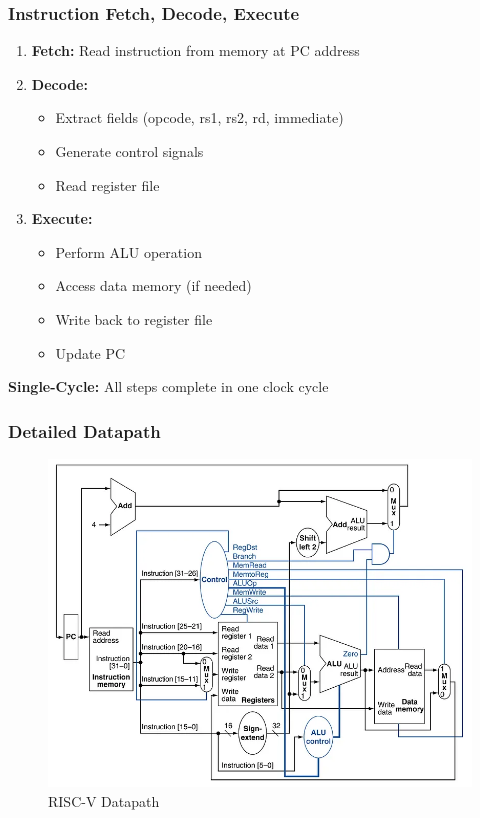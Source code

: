 \documentclass[aspectratio=169,xcolor=dvipsnames]{beamer}
\begin{document}
\begin{frame}
\frametitle{Instruction Fetch, Decode, Execute}
\begin{enumerate}
    \item \textbf{Fetch:} Read instruction from memory at PC address
    \item \textbf{Decode:} 
    \begin{itemize}
        \item Extract fields (opcode, rs1, rs2, rd, immediate)
        \item Generate control signals
        \item Read register file
    \end{itemize}
    \item \textbf{Execute:}
    \begin{itemize}
        \item Perform ALU operation
        \item Access data memory (if needed)
        \item Write back to register file
        \item Update PC
    \end{itemize}
\end{enumerate}

\vspace{1em}
\textbf{Single-Cycle:} All steps complete in one clock cycle
\end{frame}

\begin{frame}
\frametitle{Detailed Datapath}
\begin{center}
\begin{figure}
    \centering
    \includegraphics[width=0.5\linewidth]{datapath.png}
    \caption{RISC-V Datapath}
    \label{fig:enter-label}
\end{figure}
\end{center}
\end{frame}
\end{document}
